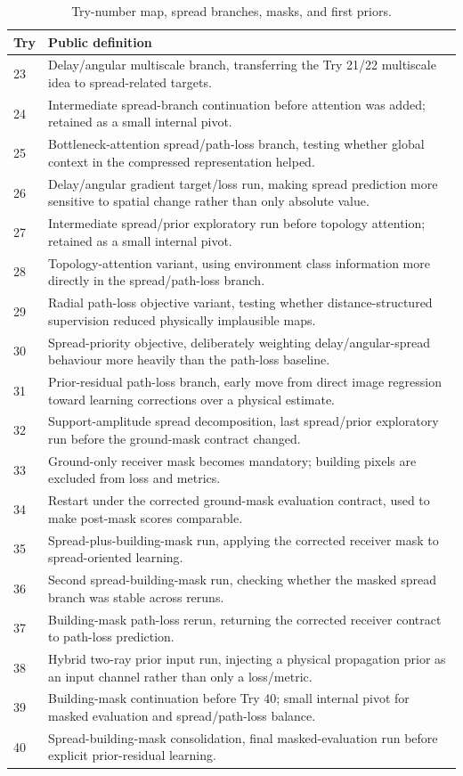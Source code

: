 \begin{table}[H]
\centering
\caption{Try-number map, spread branches, masks, and first priors.}
\label{tab:try_map_masks_priors}
\scriptsize
\renewcommand{\arraystretch}{1.06}
\begin{tabularx}{\textwidth}{p{}>{\raggedright\arraybackslash}X}
\toprule
Try & Public definition \\
\midrule
23 & Delay/angular multiscale branch, transferring the Try 21/22 multiscale idea to spread-related targets. \\
24 & Intermediate spread-branch continuation before attention was added; retained as a small internal pivot. \\
25 & Bottleneck-attention spread/path-loss branch, testing whether global context in the compressed representation helped. \\
26 & Delay/angular gradient target/loss run, making spread prediction more sensitive to spatial change rather than only absolute value. \\
27 & Intermediate spread/prior exploratory run before topology attention; retained as a small internal pivot. \\
28 & Topology-attention variant, using environment class information more directly in the spread/path-loss branch. \\
29 & Radial path-loss objective variant, testing whether distance-structured supervision reduced physically implausible maps. \\
30 & Spread-priority objective, deliberately weighting delay/angular-spread behaviour more heavily than the path-loss baseline. \\
31 & Prior-residual path-loss branch, early move from direct image regression toward learning corrections over a physical estimate. \\
32 & Support-amplitude spread decomposition, last spread/prior exploratory run before the ground-mask contract changed. \\
33 & Ground-only receiver mask becomes mandatory; building pixels are excluded from loss and metrics. \\
34 & Restart under the corrected ground-mask evaluation contract, used to make post-mask scores comparable. \\
35 & Spread-plus-building-mask run, applying the corrected receiver mask to spread-oriented learning. \\
36 & Second spread-building-mask run, checking whether the masked spread branch was stable across reruns. \\
37 & Building-mask path-loss rerun, returning the corrected receiver contract to path-loss prediction. \\
38 & Hybrid two-ray prior input run, injecting a physical propagation prior as an input channel rather than only a loss/metric. \\
39 & Building-mask continuation before Try 40; small internal pivot for masked evaluation and spread/path-loss balance. \\
40 & Spread-building-mask consolidation, final masked-evaluation run before explicit prior-residual learning. \\
\bottomrule
\end{tabularx}
\end{table}

